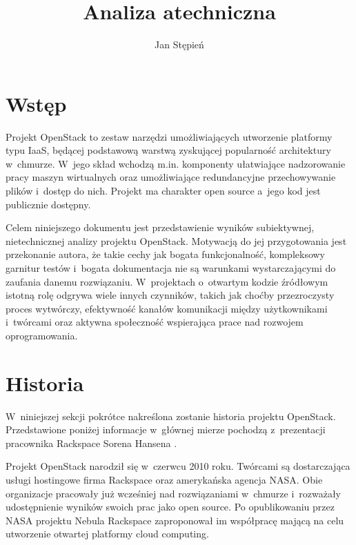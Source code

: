 


\title{Analiza atechniczna}
\author{Jan Stępień}



	\maketitle

	\section{Wstęp}

	Projekt OpenStack to zestaw narzędzi umożliwiających utworzenie platformy
	typu IaaS, będącej podstawową warstwą zyskującej popularność architektury
	w~chmurze. W~jego skład wchodzą m.in. komponenty ułatwiające nadzorowanie
	pracy maszyn wirtualnych oraz umożliwiające redundancyjne przechowywanie
	plików i~dostęp do nich. Projekt ma charakter open source a~jego kod jest
	publicznie dostępny.

	Celem niniejszego dokumentu jest przedstawienie wyników subiektywnej,
	nietechnicznej analizy projektu OpenStack. Motywacją do jej przygotowania
	jest przekonanie autora, że takie cechy jak bogata funkcjonalność,
	kompleksowy garnitur testów i~bogata dokumentacja nie są warunkami
	wystarczającymi do zaufania danemu rozwiązaniu. W~projektach o~otwartym
	kodzie źródłowym istotną rolę odgrywa wiele innych czynników, takich jak
	choćby przezroczysty proces wytwórczy, efektywność kanałów komunikacji
	między użytkownikami i~twórcami oraz aktywna społeczność wspierająca prace
	nad rozwojem oprogramowania.

	\section{Historia}

	W~niniejszej sekcji pokrótce nakreślona zostanie historia projektu
	OpenStack. Przedstawione poniżej informacje w~głównej mierze pochodzą
	z~prezentacji pracownika Rackspace Sorena Hansena \cite{hansen11}.

	Projekt OpenStack narodził się w~czerwcu 2010 roku. Twórcami są
	dostarczająca usługi hostingowe firma Rackspace oraz amerykańska agencja
	NASA. Obie organizacje pracowały już wcześniej nad rozwiązaniami w~chmurze
	i~rozważały udostępnienie wyników swoich prac jako open source. Po
	opublikowaniu przez NASA projektu Nebula Rackspace zaproponował im
	współpracę mającą na celu utworzenie otwartej platformy cloud computing.

